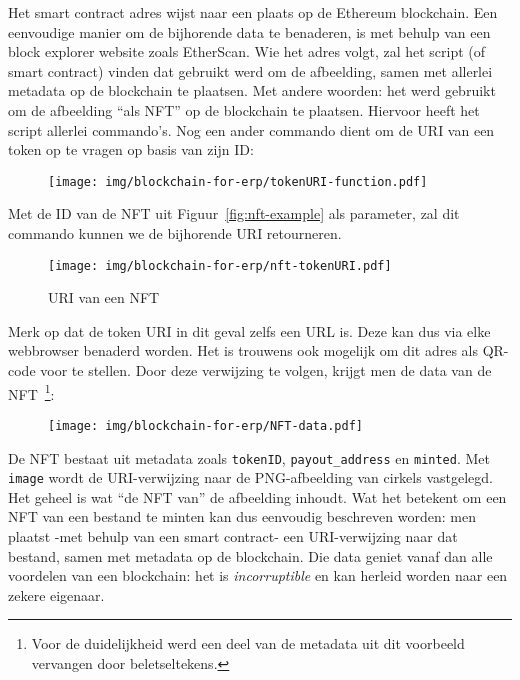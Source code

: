 Het smart contract adres wijst naar een plaats op de Ethereum blockchain. Een eenvoudige manier om de bijhorende data te benaderen, is met behulp van een block explorer website zoals EtherScan. Wie het adres volgt, zal het script (of smart contract) vinden dat gebruikt werd om de afbeelding, samen met allerlei metadata op de blockchain te plaatsen. Met andere woorden: het werd gebruikt om de afbeelding ``als NFT'' op de blockchain te plaatsen. Hiervoor heeft het script allerlei commando's. Nog een ander commando dient om de URI van een token op te vragen op basis van zijn ID:
\begin{figure}[H]
	\centering
	\texttt{[image: img/blockchain-for-erp/tokenURI-function.pdf]}
\end{figure}
Met de ID van de NFT uit Figuur~\ref{fig:nft-example} als parameter, zal dit commando kunnen we de bijhorende URI retourneren.

\begin{figure}[H]
	\centering
	\texttt{[image: img/blockchain-for-erp/nft-tokenURI.pdf]}
	\caption{\label{fig:nft-tokenURI}URI van een NFT}
\end{figure}

Merk op dat de token URI in dit geval zelfs een URL is. Deze kan dus via elke webbrowser benaderd worden. Het is trouwens ook mogelijk om dit adres als QR-code voor te stellen. Door deze verwijzing te volgen, krijgt men de data van de NFT~\footnote{Voor de duidelijkheid werd een deel van de metadata uit dit voorbeeld vervangen door beletseltekens.}:

\begin{figure}[H]
	\centering
	\texttt{[image: img/blockchain-for-erp/NFT-data.pdf]}
\end{figure}

De NFT bestaat uit metadata zoals \verb|tokenID|, \verb*|payout_address| en \verb|minted|. Met \verb*|image| wordt de URI-verwijzing naar de PNG-afbeelding van cirkels vastgelegd. Het geheel is wat ``de NFT van'' de afbeelding inhoudt. 
Wat het betekent om een NFT van een bestand te minten kan dus eenvoudig beschreven worden: men plaatst -met behulp van een smart contract- een URI-verwijzing naar dat bestand, samen met metadata op de blockchain. Die data geniet vanaf dan alle voordelen van een blockchain: het is \textit{incorruptible} en kan herleid worden naar een zekere eigenaar.

